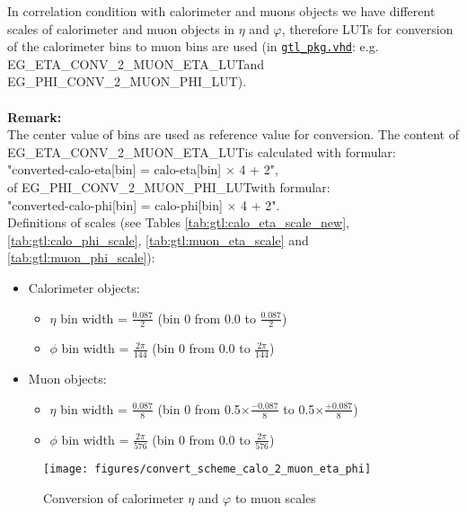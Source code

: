 In correlation condition with calorimeter and muons objects we have different scales of calorimeter and muon objects in $\eta$ and $\varphi$, therefore LUTs for conversion of the calorimeter bins to muon bins are used (in \href{\gitbranch/firmware/hdl/packages/gtl_pkg.vhd}{\texttt{\textquotesingle gtl\_pkg.vhd\textquotesingle }}:
 e.g. \small{EG\_ETA\_CONV\_2\_MUON\_ETA\_LUT}\normalsize  and \small{EG\_PHI\_CONV\_2\_MUON\_PHI\_LUT}\normalsize).\\\\
\textbf{Remark:}\\
The center value of bins are used as reference value for conversion.
The content of \small{EG\_ETA\_CONV\_2\_MUON\_ETA\_LUT}\normalsize is calculated with formular:\\ "converted-calo-eta[bin] = calo-eta[bin] $\times$ 4 + 2",\\
of \small{EG\_PHI\_CONV\_2\_MUON\_PHI\_LUT}\normalsize with formular:\\
"converted-calo-phi[bin] = calo-phi[bin] $\times$ 4 + 2".\\
Definitions of scales (see Tables \ref{tab:gtl:calo_eta_scale_new}, \ref{tab:gtl:calo_phi_scale}, \ref{tab:gtl:muon_eta_scale} and \ref{tab:gtl:muon_phi_scale}):
\begin{itemize}
\item Calorimeter objects:
    \begin{itemize}
    \item $\eta$ bin width = $\frac{0.087}{2}$ (bin 0 from 0.0 to $\frac{0.087}{2}$)
    \item $\phi$ bin width = $\frac{2\pi}{144}$ (bin 0 from 0.0 to $\frac{2\pi}{144}$)
    \end{itemize}
\item Muon objects:
    \begin{itemize}
    \item $\eta$ bin width = $\frac{0.087}{8}$ (bin 0 from \small{0.5}$\times\frac{-0.087}{8}$ to \small{0.5}$\times\frac{+0.087}{8}$)
    \item $\phi$ bin width = $\frac{2\pi}{576}$ (bin 0 from 0.0 to $\frac{2\pi}{576}$)
    \end{itemize}
\end{itemize}

\begin{figure}[htb]
\centering
\texttt{[image: figures/convert\_scheme\_calo\_2\_muon\_eta\_phi]}
\caption{Conversion of calorimeter $\eta$ and $\varphi$ to muon scales}
\label{fig:gtl:convert_scheme_calo_2_muon_eta_phi}
\end{figure}

